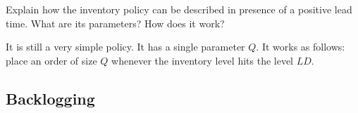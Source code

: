 


\begin{exercise}
Explain how the inventory policy can be described in presence of a positive lead time. What are its parameters? How does it work?


  \begin{solution}
It is still a very simple policy. It has a single parameter $Q$. It works as follows: place an order of size $Q$ whenever the inventory level hits the level $LD$.
  \end{solution}
\end{exercise}





\subsection{Backlogging}
\label{sec:backlogging}

